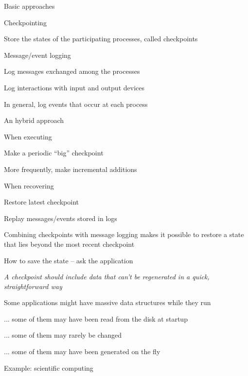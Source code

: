 \begin{frame}{Basic approaches}
	
\begin{block}{Checkpointing}
\BI
\item Store the states of the participating processes, called checkpoints 
\EI
\end{block}
\begin{block}{Message/event logging}
\BI
\item Log messages exchanged among the processes 
\item Log interactions with input and output devices
\item In general, log events that occur at each process	
\EI
\end{block}	
\end{frame}

\begin{frame}{An hybrid approach}
\BIL
\item \alert{When executing}
\BI
\item Make a periodic “big” checkpoint
\item More frequently, make incremental additions
\EI
\item \alert{When recovering}
\BI
\item Restore latest checkpoint
\item Replay messages/events stored in logs
\item Combining checkpoints with message logging makes it possible to restore a state that lies beyond the most recent checkpoint
\EI
\EIL
\end{frame}

\begin{frame}{How to save the state -- ask the application}
	
\BIL
\item \emph{A checkpoint should include data that can't be regenerated
in a quick, straightforward way}
\item Some applications might have massive data structures while they run
\BI
\item ... some of them may have been read from the disk at startup
\item ... some of them may rarely be changed
\item ... some of them may have been generated on the fly
\EI
\item Example: scientific computing
\EIL
\end{frame}


